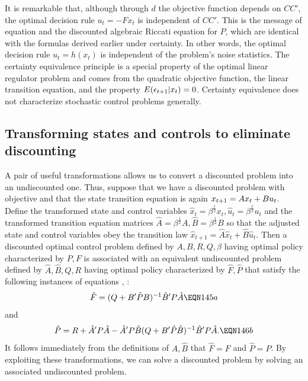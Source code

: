 It is   remarkable that, although through $d$ the
objective function  depends on $CC'$,
 the optimal decision rule $u_t=-Fx_t$ is independent of
$CC'$.  This is the message of  equation
 and the discounted algebraic Riccati
equation for $P$, which are identical with the formulas derived earlier under
certainty.  In other words, the optimal decision rule $u_t=h(x_t)$
is independent of the problem's
noise statistics. The
certainty
equivalence principle is a special property of the
optimal linear regulator problem and comes from the quadratic
objective function, the linear transition equation,
and the property $E ({\epsilon}_{t+1}  | x_t) =0$.
  Certainty
equivalence does not characterize stochastic control problems generally.
%


\subsection{Transforming states and controls to eliminate discounting}\label{sec:discounttrans}%
A pair of useful transformations allows us to convert a discounted problem into an undiscounted one.
Thus, suppose that we have a discounted problem with objective  and that the state transition equation
is again $x_{{t+1}}=Ax_t+Bu_t$.
Define the transformed state and control variables
$\hat x_t = \beta^{\frac{t}{2}} x_t, \hat u_t = \beta^{\frac{t}{2}} u_t$ and the transformed transition equation
matrices $\hat A = \beta^{\frac{1}{2}} A , \hat B =  \beta^{\frac{1}{2}} B  $ so that the adjusted state and control variables
obey the transition law $\hat x_{t+1} = \hat A \hat x_t + \hat B \hat u_t$.  Then a discounted optimal control problem
defined by $A, B, R, Q, \beta$ having  optimal policy characterized by $P, F$ is associated with an equivalent
undiscounted problem defined by $\hat A, \hat B, Q, R$ having  optimal policy characterized by $\hat F, \hat P$ that satisfy
the following instances of   equations , :
$$\hat F=(Q+B'\hat PB)^{-1}\hat B'P \hat A \EQN 145a $$
  and
$$\hat P=R+\hat A'P \hat A-\hat A'P \hat B(Q+B'\hat P \hat B)^{-1} \hat B'P \hat A.\EQN 146b$$
It follows immediately from the definitions of $\hat A, \hat B$ that $\hat F = F$ and $\hat P = P$.
By exploiting these transformations,  we can solve a discounted problem by solving an associated undiscounted problem.
%



